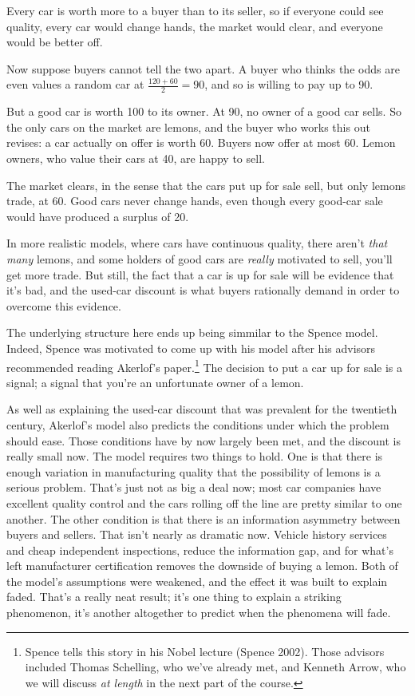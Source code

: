 \documentclass[
  11pt,
  letterpaper,
]{scrbook}
\begin{document}
Every car is worth more to a buyer than to its seller, so if everyone
could see quality, every car would change hands, the market would clear,
and everyone would be better off.

Now suppose buyers cannot tell the two apart. A buyer who thinks the
odds are even values a random car at \(\frac{120 + 60}{2} = 90\), and so
is willing to pay up to 90.

But a good car is worth 100 to its owner. At 90, no owner of a good car
sells. So the only cars on the market are lemons, and the buyer who
works this out revises: a car actually on offer is worth 60. Buyers now
offer at most 60. Lemon owners, who value their cars at 40, are happy to
sell.

The market clears, in the sense that the cars put up for sale sell, but
only lemons trade, at 60. Good cars never change hands, even though
every good-car sale would have produced a surplus of 20.

In more realistic models, where cars have continuous quality, there
aren't \emph{that many} lemons, and some holders of good cars are
\emph{really} motivated to sell, you'll get more trade. But still, the
fact that a car is up for sale will be evidence that it's bad, and the
used-car discount is what buyers rationally demand in order to overcome
this evidence.

The underlying structure here ends up being simmilar to the Spence
model. Indeed, Spence was motivated to come up with his model after his
advisors recommended reading Akerlof's paper.\footnote{Spence tells this
  story in his Nobel lecture (Spence 2002). Those advisors included
  Thomas Schelling, who we've already met, and Kenneth Arrow, who we
  will discuss \emph{at length} in the next part of the course.} The
decision to put a car up for sale is a signal; a signal that you're an
unfortunate owner of a lemon.

As well as explaining the used-car discount that was prevalent for the
twentieth century, Akerlof's model also predicts the conditions under
which the problem should ease. Those conditions have by now largely been
met, and the discount is really small now. The model requires two things
to hold. One is that there is enough variation in manufacturing quality
that the possibility of lemons is a serious problem. That's just not as
big a deal now; most car companies have excellent quality control and
the cars rolling off the line are pretty similar to one another. The
other condition is that there is an information asymmetry between buyers
and sellers. That isn't nearly as dramatic now. Vehicle history services
and cheap independent inspections, reduce the information gap, and for
what's left manufacturer certification removes the downside of buying a
lemon. Both of the model's assumptions were weakened, and the effect it
was built to explain faded. That's a really neat result; it's one thing
to explain a striking phenomenon, it's another altogether to predict
when the phenomena will fade.
\end{document}
